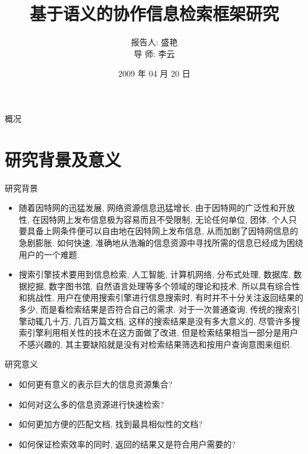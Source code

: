\documentclass[dvipdfm]{beamer}
\title{基于语义的协作信息检索框架研究}
\author{报告人: 盛艳 \\
导  师: 李云}
\institute{扬州大学信息工程学院}
\date{2009 年 04 月 20 日}
\begin{document}
\begin{frame}
  \titlepage
\end{frame}

\begin{frame}{概况}
  \tableofcontents
\end{frame}

\section{研究背景及意义}
\begin{frame}[t]{研究背景}
  \begin{block}{}
    \begin{itemize}
    \item 随着因特网的迅猛发展, 网络资源信息迅猛增长. 由于因特网的广泛性和开放性, 在因特网上发布信息极为容易而且不受限制, 无论任何单位, 团体, 个人只要具备上网条件便可以自由地在因特网上发布信息, 从而加剧了因特网信息的急剧膨胀. 如何快速, 准确地从浩瀚的信息资源中寻找所需的信息已经成为困绕用户的一个难题. \pause
    \item 搜索引擎技术要用到信息检索, 人工智能, 计算机网络, 分布式处理, 数据库, 数据挖掘, 数字图书馆, 自然语言处理等多个领域的理论和技术, 所以具有综合性和挑战性. 用户在使用搜索引擎进行信息搜索时, 有时并不十分关注返回结果的多少, 而是看检索结果是否符合自己的需求. 对于一次普通查询, 传统的搜索引擎动辄几十万, 几百万篇文档, 这样的搜索结果是没有多大意义的, 尽管许多搜索引擎利用相关性的技术在这方面做了改进, 但是检索结果相当一部分是用户不感兴趣的, 其主要缺陷就是没有对检索结果筛选和按用户查询意图来组织.
    \end{itemize}
  \end{block}
\end{frame}

\begin{frame}[t]{研究意义}
  \begin{block}{}
    \begin{itemize}
    \item 如何更有意义的表示巨大的信息资源集合? \pause 
    \item 如何对这么多的信息资源进行快速检索? \pause 
    \item 如何更加方便的匹配文档, 找到最具相似性的文档? \pause 
    \item 如何保证检索效率的同时, 返回的结果又是符合用户需要的? 
    \end{itemize}
  \end{block}
\end{frame}
\end{document}
